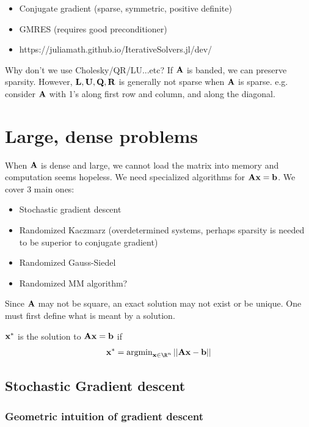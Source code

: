 \documentclass[./some_latex_template.tex]{subfiles}
\begin{document}
\begin{itemize}
	\item Conjugate gradient (sparse, symmetric, positive definite)
	\item GMRES (requires good preconditioner)
	\item https://juliamath.github.io/IterativeSolvers.jl/dev/
\end{itemize}

Why don't we use Cholesky/QR/LU...etc? If $\mathbf{A}$ is banded, we can preserve sparsity. However, $\mathbf{L}, \mathbf{U}, \mathbf{Q}, \mathbf{R}$ is generally not sparse when $\mathbf{A}$ is sparse. e.g. consider $\mathbf{A}$ with 1's along first row and column, and along the diagonal. 

\section{Large, dense problems}

When $\mathbf{A}$ is dense and large, we cannot load the matrix into memory and computation seems hopeless. We need specialized algorithms for $\mathbf{A} \mathbf{x} = \mathbf{b}$. We cover 3 main ones:
\begin{itemize}
	\item Stochastic gradient descent
	\item Randomized Kaczmarz (overdetermined systems, perhaps sparsity is needed to be superior to conjugate gradient)
	\item Randomized Gauss-Siedel
	\item Randomized MM algorithm?
\end{itemize}

Since $\mathbf{A}$ may not be square, an exact solution may not exist or be unique. One must first define what is meant by a solution. 
\begin{definition}
$\mathbf{x}^*$ is the solution to $\mathbf{A} \mathbf{x} = \mathbf{b}$ if 
\begin{align*}
	\bx^* = \argmin_{\bx \in \R^n} ||\bA\bx - \bb||
\end{align*}
\end{definition}

\subsection{Stochastic Gradient descent}

\subsubsection{Geometric intuition of gradient descent}
\end{document}
